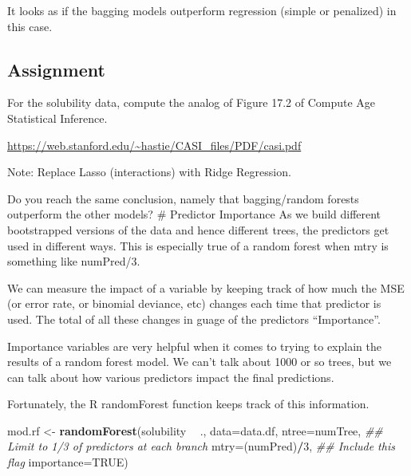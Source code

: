 \documentclass[]{article}
\newenvironment{Shaded}{\begin{snugshade}}{\end{snugshade}}
\newcommand{\CommentTok}[1]{\textcolor[rgb]{0.56,0.35,0.01}{\textit{#1}}}
\newcommand{\DataTypeTok}[1]{\textcolor[rgb]{0.13,0.29,0.53}{#1}}
\newcommand{\DecValTok}[1]{\textcolor[rgb]{0.00,0.00,0.81}{#1}}
\newcommand{\KeywordTok}[1]{\textcolor[rgb]{0.13,0.29,0.53}{\textbf{#1}}}
\newcommand{\NormalTok}[1]{#1}
\newcommand{\OperatorTok}[1]{\textcolor[rgb]{0.81,0.36,0.00}{\textbf{#1}}}
\newcommand{\OtherTok}[1]{\textcolor[rgb]{0.56,0.35,0.01}{#1}}
\newcommand{\StringTok}[1]{\textcolor[rgb]{0.31,0.60,0.02}{#1}}
\begin{document}
It looks as if the bagging models outperform regression (simple or
penalized) in this case.

\hypertarget{assignment-2}{%
\subsection{Assignment}\label{assignment-2}}

For the solubility data, compute the analog of Figure 17.2 of Compute
Age Statistical Inference.

\url{https://web.stanford.edu/~hastie/CASI_files/PDF/casi.pdf}

Note: Replace Lasso (interactions) with Ridge Regression.

Do you reach the same conclusion, namely that bagging/random forests
outperform the other models? \# Predictor Importance As we build
different bootstrapped versions of the data and hence different trees,
the predictors get used in different ways. This is especially true of a
random forest when mtry is something like numPred/3.

We can measure the impact of a variable by keeping track of how much the
MSE (or error rate, or binomial deviance, etc) changes each time that
predictor is used. The total of all these changes in guage of the
predictors ``Importance''.

Importance variables are very helpful when it comes to trying to explain
the results of a random forest model. We can't talk about 1000 or so
trees, but we can talk about how various predictors impact the final
predictions.

Fortunately, the R randomForest function keeps track of this
information.

\begin{Shaded}
\begin{Highlighting}[]
\NormalTok{mod.rf <-}\StringTok{ }\KeywordTok{randomForest}\NormalTok{(solubility }\OperatorTok{~}\StringTok{ }\NormalTok{.,}
                       \DataTypeTok{data=}\NormalTok{data.df,}
                       \DataTypeTok{ntree=}\NormalTok{numTree,}
                       \CommentTok{## Limit to 1/3 of predictors at each branch}
                       \DataTypeTok{mtry=}\NormalTok{(numPred)}\OperatorTok{/}\DecValTok{3}\NormalTok{,}
                       \CommentTok{## Include this flag}
                       \DataTypeTok{importance=}\OtherTok{TRUE}\NormalTok{)}
\end{Highlighting}
\end{Shaded}
\end{document}
